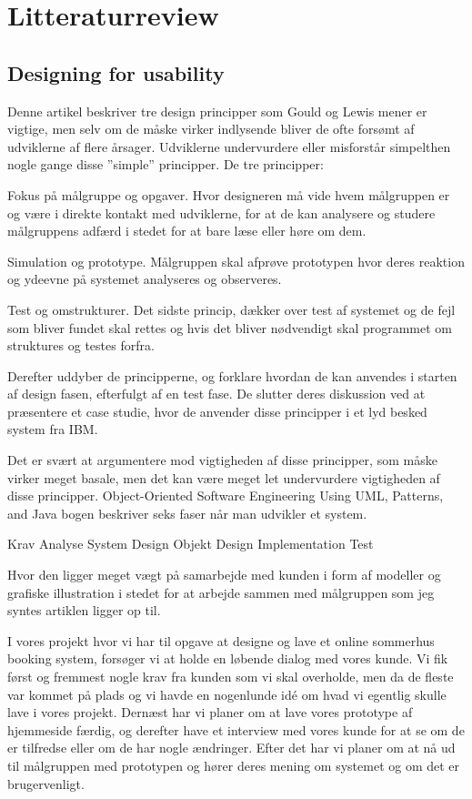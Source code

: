 \documentclass[12pt,a4paper]{article}
\begin{document}
\section{Litteraturreview}
\subsection{Designing for usability}
Denne artikel beskriver tre design principper som Gould og Lewis mener er vigtige, men selv om de måske virker indlysende bliver de ofte forsømt af udviklerne af flere årsager. Udviklerne undervurdere eller misforstår simpelthen nogle gange disse ”simple” principper. De tre principper: 

Fokus på målgruppe og opgaver. 
Hvor designeren må vide hvem målgruppen er og være i direkte kontakt med udviklerne, for at de kan analysere og studere målgruppens adfærd i stedet for at bare læse eller høre om dem. 

Simulation og prototype.
Målgruppen skal afprøve prototypen hvor deres reaktion og ydeevne på systemet analyseres og observeres.

Test og omstrukturer.
Det sidste princip, dækker over test af systemet og de fejl som bliver fundet skal rettes og hvis det bliver nødvendigt skal programmet om struktures og testes forfra.

Derefter uddyber de principperne, og forklare hvordan de kan anvendes i starten af design fasen, efterfulgt af en test fase. De slutter deres diskussion ved at præsentere et case studie, hvor de anvender disse principper i et lyd besked system fra IBM.   

Det er svært at argumentere mod vigtigheden af disse principper, som måske virker meget basale, men det kan være meget let undervurdere vigtigheden af disse principper. Object-Oriented Software Engineering Using UML, Patterns, and Java bogen beskriver seks faser når man udvikler et system.

Krav
Analyse
System Design
Objekt Design
Implementation
Test

Hvor den ligger meget vægt på samarbejde med kunden i form af modeller og grafiske illustration i stedet for at arbejde sammen med målgruppen som jeg syntes artiklen ligger op til.

I vores projekt hvor vi har til opgave at designe og lave et online sommerhus booking system, forsøger vi at holde en løbende dialog med vores kunde. Vi fik først og fremmest nogle krav fra kunden som vi skal overholde, men da de fleste var kommet på plads og vi havde en nogenlunde idé om hvad vi egentlig skulle lave i vores projekt. Dernæst har vi planer om at lave vores prototype af hjemmeside færdig, og derefter have et interview med vores kunde for at se om de er tilfredse eller om de har nogle ændringer. Efter det har vi planer om at nå ud til målgruppen med prototypen og hører deres mening om systemet og om det er brugervenligt.
\end{document}
